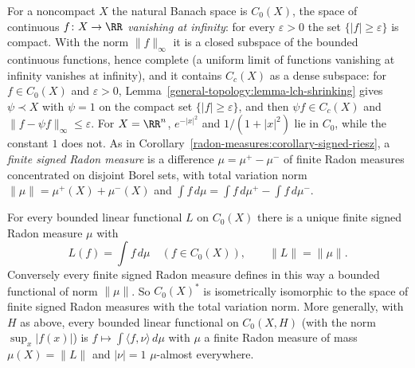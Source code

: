 For a noncompact $X$ the natural Banach space is $C_0(X)$, the space of continuous $f \colon X \to \RR$ \emph{vanishing at infinity}: for every $\varepsilon > 0$ the set $\{|f| \geq \varepsilon\}$ is compact.
With the norm $\|f\|_\infty$ it is a closed subspace of the bounded continuous functions, hence complete (a uniform limit of functions vanishing at infinity vanishes at infinity), and it contains
$C_c(X)$ as a dense subspace: for $f \in C_0(X)$ and $\varepsilon > 0$, Lemma~\ref{general-topology:lemma-lch-shrinking} gives $\psi \prec X$ with $\psi = 1$ on the compact set $\{|f| \geq \varepsilon\}$, and
then $\psi f \in C_c(X)$ and $\|f - \psi f\|_\infty \leq \varepsilon$. For $X = \RR^n$, $e^{-|x|^2}$ and $1/(1 + |x|^2)$ lie in $C_0$, while the constant $1$ does not. As in Corollary~\ref{radon-measures:corollary-signed-riesz}, a
\emph{finite signed Radon measure} is a difference $\mu = \mu^+ - \mu^-$ of finite Radon measures concentrated on disjoint Borel sets, with total variation norm $\|\mu\| = \mu^+(X) + \mu^-(X)$ and
$\int f\,d\mu = \int f\,d\mu^+ - \int f\,d\mu^-$.

\begin{corollary}\label{radon-measures:corollary-riesz-c0}
For every bounded linear functional $L$ on $C_0(X)$ there is a unique finite signed Radon measure $\mu$ with
\[
L(f) = \int f\,d\mu \quad (f \in C_0(X)), \qquad \|L\| = \|\mu\|.
\]
Conversely every finite signed Radon measure defines in this way a bounded functional of norm $\|\mu\|$. So $C_0(X)^*$ is isometrically isomorphic to the space of finite signed Radon measures with the
total variation norm. More generally, with $H$ as above, every bounded linear functional on $C_0(X, H)$ (with the norm $\sup_x|f(x)|$) is $f \mapsto \int\langle f, \nu\rangle\,d\mu$ with $\mu$ a finite Radon
measure of mass $\mu(X) = \|L\|$ and $|\nu| = 1$ $\mu$-almost everywhere.
\end{corollary}

